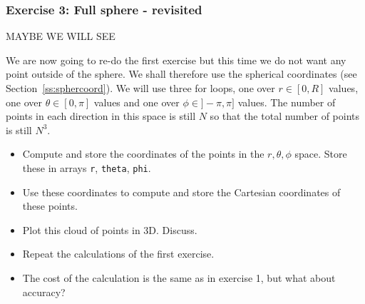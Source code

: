 \subsubsection*{Exercise 3: Full sphere - revisited}


MAYBE WE WILL SEE 

We are now going to re-do the first exercise but this time we do not want any point outside of the sphere. 
We shall therefore use the spherical coordinates (see Section~\ref{ss:sphercoord}).
We will use three for loops, one over $r\in[0,R]$ values, 
one over $\theta\in[0,\pi]$ values and one over $\phi\in]-\pi,\pi]$ values. The number 
of points in each direction in this space is still $N$ so that the total number of points is
still $N^3$.

\begin{itemize}
\item Compute and store the coordinates of the points in the $r,\theta,\phi$ space. Store 
these in arrays {\tt r}, {\tt theta}, {\tt phi}.
\item Use these coordinates to compute and store the Cartesian coordinates of these points. 
\item Plot this cloud of points in 3D. Discuss.
\item Repeat the calculations of the first exercise.
\item The cost of the calculation is the same as in exercise 1, but what about accuracy?
\end{itemize}



